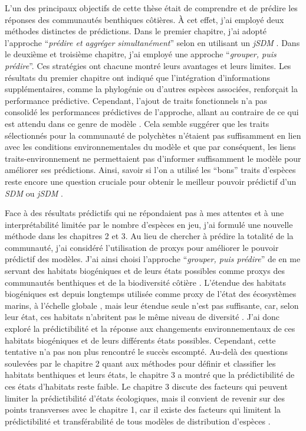 \begin{refsection}
L'un des principaux objectifs de cette thèse était de comprendre et de
prédire les réponses des communautés benthiques côtières. À cet effet,
j'ai employé deux méthodes distinctes de prédictions. Dans le premier
chapitre, j'ai adopté l'approche ``\emph{prédire et aggréger
simultanément}'' selon \textcite{Ferrier_2006} en utilisant un
\emph{jSDM} \autocite{Warton_2015}. Dans le deuxième et troisième
chapitre, j'ai employé une approche ``\emph{grouper, puis prédire}''.
Ces stratégies ont chacune montré leurs avantages et leurs limites. Les
résultats du premier chapitre ont indiqué que l'intégration
d'informations supplémentaires, comme la phylogénie ou d'autres espèces
associées, renforçait la performance prédictive. Cependant, l'ajout de
traits fonctionnels n'a pas consolidé les performances prédictives de
l'approche, allant au contraire de ce qui est attendu dans ce genre de
modèle \autocites[ ]{Ovaskainen_2017a}{Ovaskainen_2020}. Cela semble
suggérer que les traits sélectionnés pour la communauté de polychètes
n'étaient pas suffisamment en lien avec les conditions environnementales
du modèle et que par conséquent, les liens traits-environnement ne
permettaient pas d'informer suffisamment le modèle pour améliorer ses
prédictions. Ainsi, savoir si l'on a utilisé les ``bons'' traits
d'espèces reste encore une question cruciale pour obtenir le meilleur
pouvoir prédictif d'un \emph{SDM} ou \emph{jSDM} \autocite{Vesk_2021}.

Face à des résultats prédictifs qui ne répondaient pas à mes attentes et
à une interprétabilité limitée par le nombre d'espèces en jeu, j'ai
formulé une nouvelle méthode dans les chapitres 2 et 3. Au lieu de
chercher à prédire la totalité de la communauté, j'ai considéré
l'utilisation de proxys pour améliorer le pouvoir prédictif des modèles.
J'ai ainsi choisi l'approche ``\emph{grouper, puis prédire}'' de
\textcite{Ferrier_2006} en me servant des habitats biogéniques et de
leurs états possibles comme proxys des communautés benthiques et de la
biodiversité côtière \autocite{PelletierD_2020}. L'étendue des habitats
biogéniques est depuis longtemps utilisée comme proxy de l'état des
écosystèmes marins, à l'échelle globale \autocite{Stuart_2010}, mais
leur étendue seule n'est pas suffisante, car, selon leur état, ces
habitats n'abritent pas le même niveau de diversité
\autocite{Sunday_2017}. J'ai donc exploré la prédictibilité et la
réponse aux changements environnementaux de ces habitats biogéniques et
de leurs différents états possibles. Cependant, cette tentative n'a pas
non plus rencontré le succès escompté. Au-delà des questions soulevées
par le chapitre 2 quant aux méthodes pour définir et classifier les
habitats benthiques et leurs états, le chapitre 3 a montré que la
prédictibilité de ces états d'habitats reste faible. Le chapitre 3
discute des facteurs qui peuvent limiter la prédictibilité d'états
écologiques, mais il convient de revenir sur des points transverses avec
le chapitre 1, car il existe des facteurs qui limitent la prédictibilité
et transférabilité de tous modèles de distribution d'espèces
\autocite{Yates_2018}.


\end{refsection}
